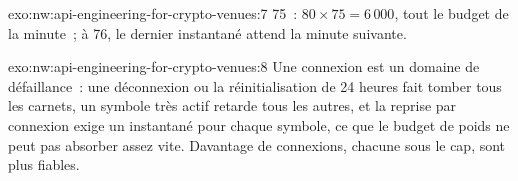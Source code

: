 \begin{solution}{exo:nw:api-engineering-for-crypto-venues:7}
75~: $80 \times 75 = 6\,000$, tout le budget de la minute~; à 76, le dernier instantané attend la minute suivante.
\end{solution}

\begin{solution}{exo:nw:api-engineering-for-crypto-venues:8}
Une connexion est un domaine de défaillance~: une déconnexion ou la réinitialisation de 24 heures fait tomber tous les carnets, un symbole très actif retarde tous les autres, et la reprise par
connexion exige un instantané pour chaque symbole, ce que le budget de poids ne peut pas absorber assez vite. Davantage de connexions, chacune sous le cap, sont plus fiables.
\end{solution}

